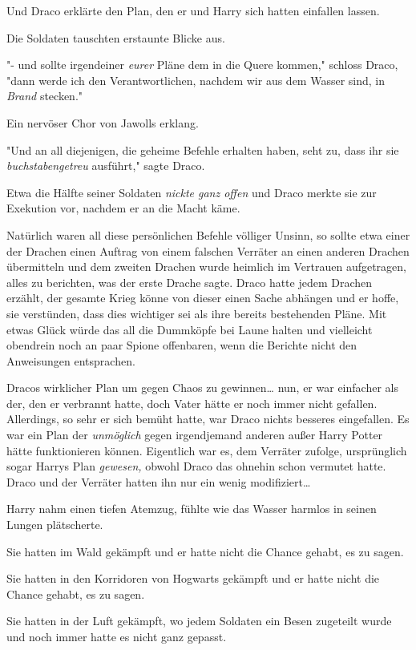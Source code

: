 {Und Draco erklärte den Plan, den er und Harry sich hatten einfallen lassen.

Die Soldaten tauschten erstaunte Blicke aus.

"- und sollte irgendeiner \emph{eurer} Pläne dem in die Quere kommen," schloss Draco, "dann werde ich den Verantwortlichen, nachdem wir aus dem Wasser sind, in \emph{Brand} stecken."

Ein nervöser Chor von Jawolls erklang.

"Und an all diejenigen, die geheime Befehle erhalten haben, seht zu, dass ihr sie \emph{buchstabengetreu} ausführt," sagte Draco.

Etwa die Hälfte seiner Soldaten \emph{nickte ganz offen} und Draco merkte sie zur Exekution vor, nachdem er an die Macht käme.

Natürlich waren all diese persönlichen Befehle völliger Unsinn, so sollte etwa einer der Drachen einen Auftrag von einem falschen Verräter an einen anderen Drachen übermitteln und dem zweiten Drachen wurde heimlich im Vertrauen aufgetragen, alles zu berichten, was der erste Drache sagte. Draco hatte jedem Drachen erzählt, der gesamte Krieg könne von dieser einen Sache abhängen und er hoffe, sie verstünden, dass dies wichtiger sei als ihre bereits bestehenden Pläne. Mit etwas Glück würde das all die Dummköpfe bei Laune halten und vielleicht obendrein noch an paar Spione offenbaren, wenn die Berichte nicht den Anweisungen entsprachen.

Dracos wirklicher Plan um gegen Chaos zu gewinnen… nun, er war einfacher als der, den er verbrannt hatte, doch Vater hätte er noch immer nicht gefallen. Allerdings, so sehr er sich bemüht hatte, war Draco nichts besseres eingefallen. Es war ein Plan der \emph{unmöglich} gegen irgendjemand anderen außer Harry Potter hätte funktionieren können. Eigentlich war es, dem Verräter zufolge, ursprünglich sogar Harrys Plan \emph{gewesen,} obwohl Draco das ohnehin schon vermutet hatte. Draco und der Verräter hatten ihn nur ein wenig modifiziert…

\later

Harry nahm einen tiefen Atemzug, fühlte wie das Wasser harmlos in seinen Lungen plätscherte.

Sie hatten im Wald gekämpft und er hatte nicht die Chance gehabt, es zu sagen.

Sie hatten in den Korridoren von Hogwarts gekämpft und er hatte nicht die Chance gehabt, es zu sagen.

Sie hatten in der Luft gekämpft, wo jedem Soldaten ein Besen zugeteilt wurde und noch immer hatte es nicht ganz gepasst.

}
